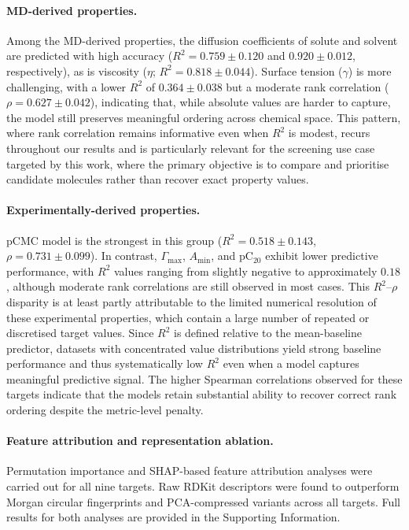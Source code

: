 \documentclass[11pt]{aime}
\begin{document}
\paragraph{MD-derived properties.}
Among the MD-derived properties, the diffusion coefficients of solute and solvent are predicted with high accuracy ($R^2 = 0.759 \pm 0.120$ and $0.920 \pm 0.012$, respectively), as is viscosity ($\eta$;
$R^2 = 0.818 \pm 0.044$).
Surface tension ($\gamma$) is more challenging, with a lower $R^2$ of $0.364 \pm 0.038$ but a moderate rank correlation ($\rho = 0.627 \pm 0.042$), indicating that, while absolute values are harder to capture, the model still preserves meaningful ordering across chemical space.
This pattern, where rank correlation remains informative even when $R^2$ is modest, recurs throughout our results and is particularly relevant for the screening use case targeted by this work, where the primary objective is to compare and prioritise candidate molecules rather than recover exact property values.


\paragraph{Experimentally-derived properties.}
pCMC model is the strongest in this group ($R^2 = 0.518 \pm 0.143$, $\rho = 0.731 \pm 0.099$).
In contrast, $\Gamma_{\max}$, $A_{\min}$, and pC$_{20}$ exhibit lower predictive performance, with $R^2$ values ranging from slightly negative to approximately $0.18$, although moderate rank correlations are still observed in most cases.
This $R^2$--$\rho$ disparity is at least partly attributable to the limited numerical resolution of these experimental properties, which contain a large number of repeated or discretised target values.
Since $R^2$ is defined relative to the mean-baseline predictor, datasets with concentrated value distributions yield strong baseline performance and thus systematically low $R^2$ even when a model captures meaningful predictive signal.
The higher Spearman correlations observed for these targets indicate that the models retain substantial ability to recover correct rank ordering despite the metric-level penalty.

\paragraph{Feature attribution and representation ablation.}
Permutation importance and SHAP-based feature attribution analyses were carried out for all nine targets.
Raw RDKit descriptors were found to outperform Morgan circular fingerprints and PCA-compressed variants across all targets.
Full results for both analyses are provided in the Supporting Information.
\end{document}
